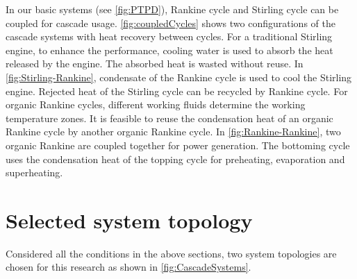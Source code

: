 In our basic systems (see \autoref{fig:PTPD}), Rankine cycle and Stirling cycle can be coupled for cascade usage. 
\autoref{fig:coupledCycles} shows two configurations of the cascade systems with heat recovery between cycles. 
For a traditional Stirling engine, to enhance the performance, cooling water is used to absorb the heat released by the engine. The absorbed heat is wasted without reuse.
In \autoref{fig:Stirling-Rankine}, condensate of the Rankine cycle is used to cool the Stirling engine. Rejected heat of the Stirling cycle can be recycled by Rankine cycle. 
For organic Rankine cycles, different working fluids determine the working temperature zones. It is feasible to reuse the condensation heat of an organic Rankine cycle by another organic Rankine cycle.
In \autoref{fig:Rankine-Rankine}, two organic Rankine are coupled together for power generation. The bottoming cycle uses the condensation heat of the topping cycle for preheating, evaporation and superheating.

\section{Selected system topology}
\label{sec:sst}
Considered all the conditions in the above sections, two system topologies are chosen for this research as shown in \autoref{fig:CascadeSystems}. 

